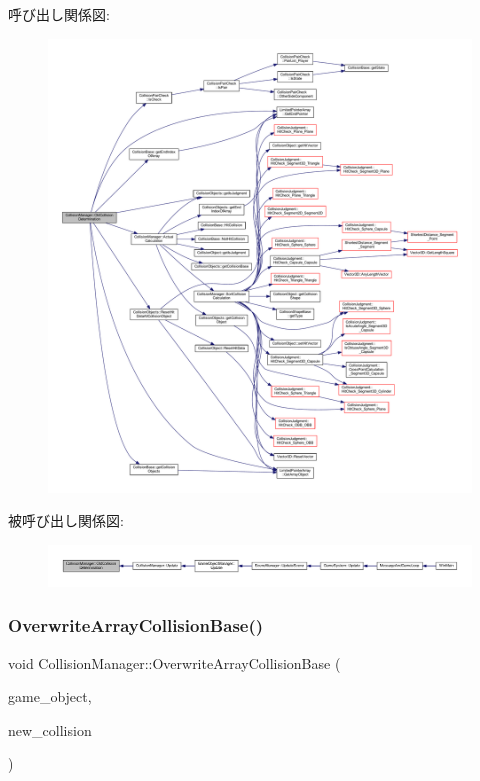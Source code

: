 呼び出し関係図\+:
\nopagebreak
\begin{figure}[H]
\begin{center}
\leavevmode
\includegraphics[width=350pt]{class_collision_manager_a25dbc14dbc709a6bc2dc4424e3965dbe_cgraph}
\end{center}
\end{figure}
被呼び出し関係図\+:
\nopagebreak
\begin{figure}[H]
\begin{center}
\leavevmode
\includegraphics[width=350pt]{class_collision_manager_a25dbc14dbc709a6bc2dc4424e3965dbe_icgraph}
\end{center}
\end{figure}
\mbox{\label{class_collision_manager_af9c2ce87e0189cdd1256c83decc64673}} 
\subsubsection{\texorpdfstring{Overwrite\+Array\+Collision\+Base()}{OverwriteArrayCollisionBase()}}
{\footnotesize\ttfamily void Collision\+Manager\+::\+Overwrite\+Array\+Collision\+Base (\begin{DoxyParamCaption}\item[{\mbox{\hyperlink{class_game_object_base}{Game\+Object\+Base}} $\ast$}]{game\+\_\+object,  }\item[{\mbox{\hyperlink{class_collision_base}{Collision\+Base}} $\ast$}]{new\+\_\+collision }\end{DoxyParamCaption})}



